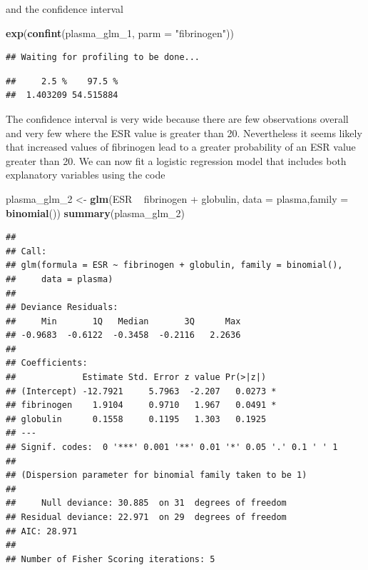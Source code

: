 \documentclass[]{article}
\newenvironment{Shaded}{\begin{snugshade}}{\end{snugshade}}
\newcommand{\KeywordTok}[1]{\textcolor[rgb]{0.13,0.29,0.53}{\textbf{{#1}}}}
\newcommand{\DataTypeTok}[1]{\textcolor[rgb]{0.13,0.29,0.53}{{#1}}}
\newcommand{\StringTok}[1]{\textcolor[rgb]{0.31,0.60,0.02}{{#1}}}
\newcommand{\NormalTok}[1]{{#1}}
\numberwithin{equation}{section}
\begin{document}
and the confidence interval

\begin{Shaded}
\begin{Highlighting}[]
\KeywordTok{exp}\NormalTok{(}\KeywordTok{confint}\NormalTok{(plasma_glm_1, }\DataTypeTok{parm =} \StringTok{"fibrinogen"}\NormalTok{))}
\end{Highlighting}
\end{Shaded}

\begin{verbatim}
## Waiting for profiling to be done...
\end{verbatim}

\begin{verbatim}
##     2.5 %    97.5 % 
##  1.403209 54.515884
\end{verbatim}

The confidence interval is very wide because there are few observations
overall and very few where the ESR value is greater than 20.
Nevertheless it seems likely that increased values of fibrinogen lead to
a greater probability of an ESR value greater than 20. We can now fit a
logistic regression model that includes both explanatory variables using
the code

\begin{Shaded}
\begin{Highlighting}[]
\NormalTok{plasma_glm_2 <-}\StringTok{ }\KeywordTok{glm}\NormalTok{(ESR ~}\StringTok{ }\NormalTok{fibrinogen +}\StringTok{ }\NormalTok{globulin, }\DataTypeTok{data =} \NormalTok{plasma,}\DataTypeTok{family =} \KeywordTok{binomial}\NormalTok{())}
\KeywordTok{summary}\NormalTok{(plasma_glm_2)}
\end{Highlighting}
\end{Shaded}

\begin{verbatim}
## 
## Call:
## glm(formula = ESR ~ fibrinogen + globulin, family = binomial(), 
##     data = plasma)
## 
## Deviance Residuals: 
##     Min       1Q   Median       3Q      Max  
## -0.9683  -0.6122  -0.3458  -0.2116   2.2636  
## 
## Coefficients:
##             Estimate Std. Error z value Pr(>|z|)  
## (Intercept) -12.7921     5.7963  -2.207   0.0273 *
## fibrinogen    1.9104     0.9710   1.967   0.0491 *
## globulin      0.1558     0.1195   1.303   0.1925  
## ---
## Signif. codes:  0 '***' 0.001 '**' 0.01 '*' 0.05 '.' 0.1 ' ' 1
## 
## (Dispersion parameter for binomial family taken to be 1)
## 
##     Null deviance: 30.885  on 31  degrees of freedom
## Residual deviance: 22.971  on 29  degrees of freedom
## AIC: 28.971
## 
## Number of Fisher Scoring iterations: 5
\end{verbatim}
\end{document}
